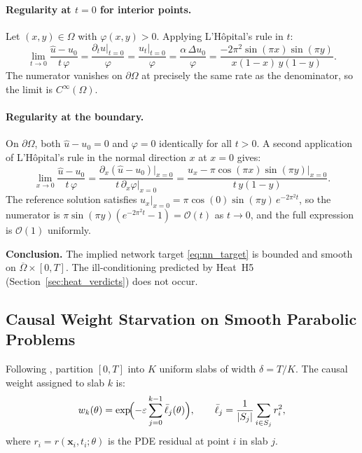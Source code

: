 \documentclass{article}
\newcommand{\bfx}{\mathbf{x}}
\begin{document}
\paragraph{Regularity at $t=0$ for interior points.}
Let $(x,y)\in\Omega$ with $\varphi(x,y) > 0$.
Applying L'H\^opital's rule in $t$:
\begin{equation}
  \lim_{t\to0} \frac{\hat{u} - u_0}{t\,\varphi}
  = \frac{\partial_t \hat{u}\big|_{t=0}}{\varphi}
  = \frac{u_t\big|_{t=0}}{\varphi}
  = \frac{\alpha\,\Delta u_0}{\varphi}
  = \frac{-2\pi^2\sin(\pi x)\sin(\pi y)}{x(1-x)\,y(1-y)}.
\label{eq:hopital_t}
\end{equation}
The numerator vanishes on $\partial\Omega$ at precisely the same rate as
the denominator, so the limit is $C^\infty(\Omega)$.

\paragraph{Regularity at the boundary.}
On $\partial\Omega$, both $\hat{u} - u_0 = 0$ and $\varphi = 0$
identically for all $t > 0$.
A second application of L'H\^opital's rule in the normal direction
$x$ at $x = 0$ gives:
\begin{equation}
  \lim_{x\to0} \frac{\hat{u} - u_0}{t\,\varphi}
  = \frac{\partial_x(\hat{u} - u_0)\big|_{x=0}}{t\,\partial_x\varphi\big|_{x=0}}
  = \frac{u_x - \pi\cos(\pi x)\sin(\pi y)\big|_{x=0}}{t\,y(1-y)}.
\label{eq:hopital_x}
\end{equation}
The reference solution satisfies $u_x\big|_{x=0} = \pi\cos(0)\sin(\pi y)\,e^{-2\pi^2t}$,
so the numerator is $\pi\sin(\pi y)(e^{-2\pi^2t} - 1) = \mathcal{O}(t)$ as $t\to0$,
and the full expression is $\mathcal{O}(1)$ uniformly.

\textbf{Conclusion.}
The implied network target \eqref{eq:nn_target} is bounded and smooth on
$\overline{\Omega}\times[0,T]$.
The ill-conditioning predicted by Heat~H5 (Section~\ref{sec:heat_verdicts}) does not occur.

\subsection{Causal Weight Starvation on Smooth Parabolic Problems}
\label{app:causal_starvation}

Following \citet{wang2022causal}, partition $[0,T]$ into $K$ uniform slabs
of width $\delta = T/K$.
The causal weight assigned to slab $k$ is:
\begin{equation}
  w_k(\theta) = \exp\!\Bigl(-\varepsilon\sum_{j=0}^{k-1}\bar{\ell}_j(\theta)\Bigr),
  \qquad
  \bar{\ell}_j = \frac{1}{|S_j|}\sum_{i\in S_j} r_i^2,
\label{eq:causal_weight}
\end{equation}
where $r_i = r(\bfx_i,t_i;\theta)$ is the PDE residual at point $i$ in slab $j$.
\end{document}
